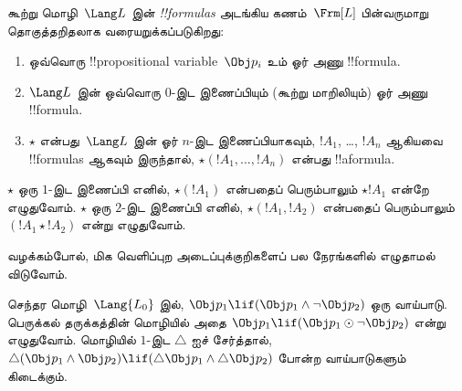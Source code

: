 \documentclass[../../../include/open-logic-section]{subfiles}
\begin{document}


\begin{defn}[வாய்பாடு]
கூற்று மொழி~$\Lang L$ இன் \emph{!!{formula}s} அடங்கிய கணம்~$\Frm[L]$
பின்வருமாறு தொகுத்தறிதலாக வரையறுக்கப்படுகிறது:
\begin{enumerate}
\item ஒவ்வொரு !!{propositional variable}~$\Obj p_i$ உம் ஓர் அணு
  !!{formula}.
\item $\Lang L$ இன் ஒவ்வொரு $0$-இட இணைப்பியும் (கூற்று மாறிலியும்)
  ஓர் அணு !!{formula}.
\item $\star$ என்பது~$\Lang L$ இன் ஓர் $n$-இட இணைப்பியாகவும், $!A_1$,
\dots, $!A_n$ ஆகியவை !!{formula}s ஆகவும் இருந்தால்,
$\star(!A_1, \dots, !A_n)$ என்பது !!a{formula}.
\end{enumerate}
$\star$ ஒரு $1$-இட இணைப்பி எனில், $\star(!A_1)$ என்பதைப் பெரும்பாலும்
$\star !A_1$ என்றே எழுதுவோம். $\star$ ஒரு $2$-இட இணைப்பி எனில்,
$\star(!A_1,!A_2)$ என்பதைப் பெரும்பாலும் $(!A_1 \star !A_2)$ என்று
எழுதுவோம்.
\end{defn}

வழக்கம்போல், மிக வெளிப்புற அடைப்புக்குறிகளைப் பல நேரங்களில் எழுதாமல்
விடுவோம்.

\begin{ex}
  செந்தர மொழி~$\Lang{L_0}$ இல், $\Obj p_1 \lif (\Obj p_1
  \land \lnot \Obj p_2)$ ஒரு வாய்பாடு. பெருக்கல் தருக்கத்தின் மொழியில்
  அதை $\Obj p_1 \lif (\Obj p_1 \odot
  \lnot \Obj p_2)$ என்று எழுதுவோம். மொழியில் $1$-இட
  $\triangle$ ஐச் சேர்த்தால், $\triangle (\Obj p_1
  \land \Obj p_2) \lif (\triangle \Obj p_1 \land \triangle \Obj p_2)$
  போன்ற வாய்பாடுகளும் கிடைக்கும்.
\end{ex}
\end{document}
